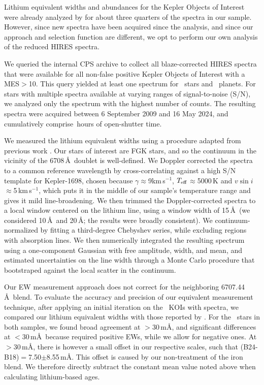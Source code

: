 \documentclass[11pt,twocolumn,tighten]{aastex63}
\newcommand{\kms}{{km\,s$^{-1}$}}
\begin{document}
Lithium equivalent widths and abundances for the Kepler Objects of
Interest were already analyzed by \citet{2018ApJ...855..115B} for
about three quarters of the spectra in our sample.  However, since new
spectra have been acquired since the \citeauthor{2018ApJ...855..115B}
analysis, and since our approach and selection function are different,
we opt to perform our own analysis of the reduced HIRES spectra.

We queried the internal CPS archive to collect all blaze-corrected
HIRES spectra that were available for all non-false positive Kepler
Objects of Interest with a MES$>$10.  This query yielded at least one
spectrum for \nlithiumstars\ stars and \nlithiumplanets\ planets.  For
stars with multiple spectra available at varying ranges of
signal-to-noise (S/N), we analyzed only the spectrum with the highest
number of counts.  The resulting spectra were acquired between 6
September 2009 and 16 May 2024, and cumulatively comprise
\nhireshours\,hours of open-shutter time.

We measured the lithium equivalent widths using a procedure
adapted from previous work \citep{Bouma_2021}.  Our stars of interest
are FGK stars, and so the continuum in the vicinity of the 
6708\,\AA\ doublet is well-defined.  We Doppler corrected the spectra
to a common reference wavelength by cross-correlating against a high
S/N template for Kepler-1698, chosen because $\gamma$$\approx$9\kms,
$T_{\rm eff}$$\approx$5000\,K and $v\sin i$$\approx$5\,\kms, which
puts it in the middle of our sample's temperature range and gives it
mild line-broadening.  We then trimmed the Doppler-corrected spectra
to a local window centered on the lithium line, using a window width
of 15\,\AA\ (we considered 10\,\AA\ and 20\,\AA; the results were
broadly consistent).  We continuum-normalized by fitting a
third-degree Chebyshev series, while excluding regions with
absorption lines.  We then numerically integrated the resulting
spectrum using a one-component Gaussian with free amplitude, width,
and mean, and estimated uncertainties on the line width through a
Monte Carlo procedure that bootstraped against the local scatter in
the continuum.

Our EW measurement approach does not correct for the neighboring
 6707.44\,\AA\ blend.  To evaluate the accuracy and
precision of our equivalent measurement technique, after applying an
initial iteration on the \nlithiumstars\ KOIs with spectra, we
compared our lithium equivalent widths with those reported by
\citet{2018ApJ...855..115B}.  For the \nbergeroverlap\ stars in both
samples, we found broad agreement at $>$30\,m\AA, and significant
differences at $<$30\,m\AA\ because \citet{2018ApJ...855..115B}
required positive EWs, while we allow for negative ones.  At
$>$30\,m\AA, there is however a small offset in our respective
scales, such that (B24-B18)$=$7.50$\pm$8.55\,m\AA.  This offset is
caused by our non-treatment of the iron blend.  We therefore directly
subtract the constant mean value noted above when calculating
lithium-based ages.
\end{document}
